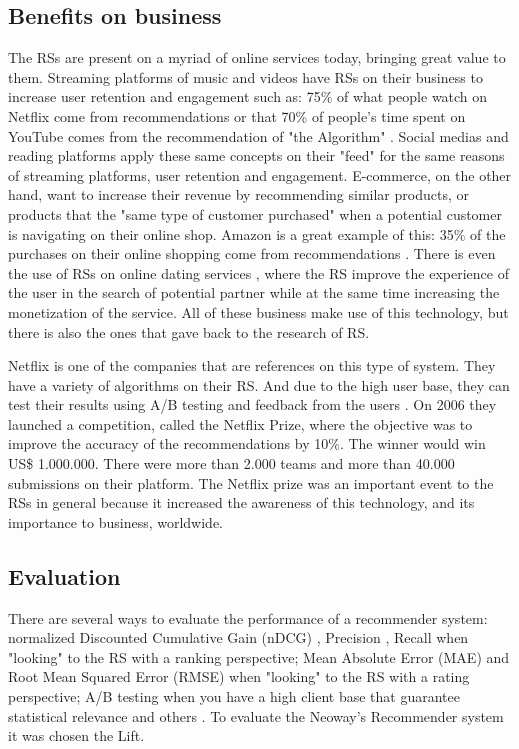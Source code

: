 \subsection{Benefits on business}

The RSs are present on a myriad of online services today, bringing great value to them. Streaming platforms of music and videos have RSs on their business to increase user retention and engagement such as: 75\% of what people watch on Netflix come from recommendations \cite{HowretailerscankeepupwithconsumersMcKinsey} or that 70\% of people's time spent on YouTube comes from the recommendation of "the Algorithm" \cite{CES2018YouTubesAIrecommendationsdrive70percentofviewingCNET}. Social medias and reading platforms apply these same concepts on their "feed" for the same reasons of streaming platforms, user retention and engagement. E-commerce, on the other hand, want to increase their revenue by recommending similar products, or products that the "same type of customer purchased" when a potential customer is navigating on their online shop. Amazon is a great example of this: 35\% of the purchases on their online shopping come from recommendations \cite{HowretailerscankeepupwithconsumersMcKinsey}. There is even the use of RSs on online dating services \cite{brozovsky2007recommender}, where the RS improve the experience of the user in the search of potential partner while at the same time increasing the monetization of the service. All of these business make use of this technology, but there is also the ones that gave back to the research of RS.

Netflix is one of the companies that are references on this type of system. They have a variety of algorithms on their RS. And due to the high user base, they can test their results using A/B testing and feedback from the users \cite{gomez2016netflix}. On 2006 they launched a competition, called the Netflix Prize, where the objective was to improve the accuracy of the recommendations by 10\%. The winner would win US\$ 1.000.000. There were more than 2.000 teams and more than 40.000 submissions on their platform. The Netflix prize was an important event to the RSs in general because it increased the awareness of this technology, and its importance to business, worldwide. 

\subsection{Evaluation}

There are several ways to evaluate the performance of a recommender system: normalized Discounted Cumulative Gain (nDCG) \cite{jarvelin2002cumulated}, Precision \cite{Precision-rs-metric}, Recall \cite{cremonesi2010performance} when "looking" to the RS with a ranking perspective; Mean Absolute Error (MAE) \cite{breese1998empirical} and Root Mean Squared Error (RMSE) \cite{bennett2007netflix} when "looking" to the RS with a rating perspective; A/B testing when you have a high client base that guarantee statistical relevance and others \cite{parra2013recommender}. To evaluate the Neoway's Recommender system it was chosen the Lift.

